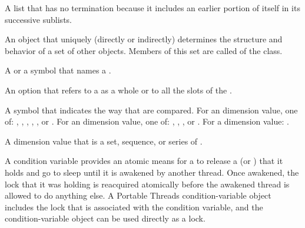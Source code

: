 \begin{glossary-list}
%
%
A list that has no termination because it includes an earlier portion of
itself in its successive sublists.


\glent[class]
%
%
%
An object that uniquely (directly or indirectly) determines the structure and
behavior of a set of other objects. Members of this set are called
 of the class.


%
%
%
%
A  or a symbol that names a .


%
%
An option that refers to a  as a whole or to all the slots of the
.


%
%
%
%
%
%
%
%
%
%
%
%
%
%
A symbol that indicates the way that  are compared.
For an  dimension value, one of: ,
, , , ,
or .  For an  dimension value, one of:
, , , or .  For a 
dimension value: .


% 
%
A dimension value that is a set, sequence, or series of
.


%
%
% 
%
A condition variable provides an atomic means for a  to release
a  (or ) that it holds and go to sleep until
it is awakened by another thread.  Once awakened, the lock that it was holding
is reacquired atomically before the awakened thread is allowed to do anything
else.  A Portable Threads condition-variable object includes the lock that is
associated with the condition variable, and the condition-variable object can
be used directly as a lock.


\end{glossary-list}
